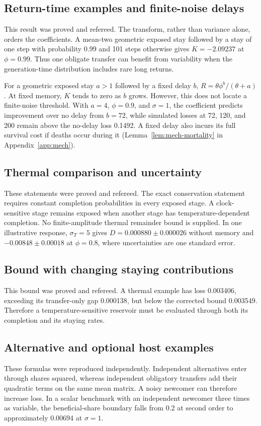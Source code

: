 \subsection{Return-time examples and finite-noise delays}\label{esm:trim-renewal}
This result was proved and refereed. The transform, rather than variance alone, orders the coefficients. A mean-two geometric exposed stay followed by a stay of one step with probability 0.99 and 101 steps otherwise gives \(K=-2.09237\) at \(\phi=0.99\). Thus one obligate transfer can benefit from variability when the generation-time distribution includes rare long returns.

For a geometric exposed stay \(a>1\) followed by a fixed delay \(b\), \(R=\theta\phi^b/(\theta+a)\). At fixed memory, \(K\) tends to zero as \(b\) grows. However, this does not locate a finite-noise threshold. With \(a=4\), \(\phi=0.9\), and \(\sigma=1\), the coefficient predicts improvement over no delay from \(b=72\), while simulated losses at 72, 120, and 200 remain above the no-delay loss 0.1492. A fixed delay also incurs its full survival cost if deaths occur during it (Lemma~\ref{lem:mech-mortality} in Appendix~\ref{app:mech}).

\subsection{Thermal comparison and uncertainty}\label{esm:trim-thermal}
These statements were proved and refereed. The exact conservation statement requires constant completion probabilities in every exposed stage. A clock-sensitive stage remains exposed when another stage has temperature-dependent completion. No finite-amplitude thermal remainder bound is supplied. In one illustrative response, \(\sigma_T=5\) gives \(D=0.000880\pm0.000026\) without memory and \(-0.00848\pm0.00018\) at \(\phi=0.8\), where uncertainties are one standard error.

\subsection{Bound with changing staying contributions}\label{esm:trim-edge-bound}
This bound was proved and refereed. A thermal example has loss 0.003406, exceeding its transfer-only gap 0.000138, but below the corrected bound 0.003549. Therefore a temperature-sensitive reservoir must be evaluated through both its completion and its staying rates.

\subsection{Alternative and optional host examples}\label{esm:trim-routes}
These formulas were reproduced independently. Independent alternatives enter through shares squared, whereas independent obligatory transfers add their quadratic terms on the same mean matrix. A noisy newcomer can therefore increase loss. In a scalar benchmark with an independent newcomer three times as variable, the beneficial-share boundary falls from 0.2 at second order to approximately 0.00694 at \(\sigma=1\).

